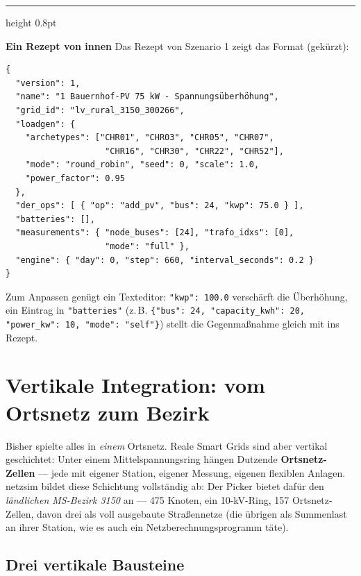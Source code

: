 \documentclass[11pt,a4paper,parskip=half]{scrreprt}
\newenvironment{beispiel}[1][Beispiel]
  {\par\medskip
   {\color{bsp}\hrule height 0.8pt}\nopagebreak\smallskip
   \noindent\textbf{\textsf{\textcolor{bsp}{#1}}}\quad\ignorespaces}
  {\par\nopagebreak\smallskip{\color{bsp}\hrule height 0.8pt}\par\medskip}
\begin{document}
\begin{beispiel}[Ein Rezept von innen]
Das Rezept von Szenario 1 zeigt das Format (gekürzt):

\begin{lstlisting}
{
  "version": 1,
  "name": "1 Bauernhof-PV 75 kW - Spannungsüberhöhung",
  "grid_id": "lv_rural_3150_300266",
  "loadgen": {
    "archetypes": ["CHR01", "CHR03", "CHR05", "CHR07",
                    "CHR16", "CHR30", "CHR22", "CHR52"],
    "mode": "round_robin", "seed": 0, "scale": 1.0,
    "power_factor": 0.95
  },
  "der_ops": [ { "op": "add_pv", "bus": 24, "kwp": 75.0 } ],
  "batteries": [],
  "measurements": { "node_buses": [24], "trafo_idxs": [0],
                    "mode": "full" },
  "engine": { "day": 0, "step": 660, "interval_seconds": 0.2 }
}
\end{lstlisting}

Zum Anpassen genügt ein Texteditor: \texttt{"kwp": 100.0}
verschärft die Überhöhung, ein Eintrag in \texttt{"batteries"}
(z.\,B. \texttt{\{"bus": 24, "capacity\_kwh": 20, "power\_kw": 10,
"mode": "self"\}}) stellt die Gegenmaßnahme gleich mit ins Rezept.
\end{beispiel}

\chapter{Vertikale Integration: vom Ortsnetz zum Bezirk}
\label{ch:vertikal}

Bisher spielte alles in \emph{einem} Ortsnetz. Reale Smart Grids sind
aber vertikal geschichtet: Unter einem Mittelspannungsring hängen
Dutzende \textbf{Ortsnetz-Zellen} --- jede mit eigener Station, eigener
Messung, eigenen flexiblen Anlagen. netzsim bildet diese Schichtung
vollständig ab: Der Picker bietet dafür den \emph{ländlichen MS-Bezirk
3150} an --- 475 Knoten, ein 10-kV-Ring, 157 Ortsnetz-Zellen, davon
drei als voll ausgebaute Straßennetze (die übrigen als Summenlast an
ihrer Station, wie es auch ein Netzberechnungsprogramm täte).

\section{Drei vertikale Bausteine}
\end{document}
